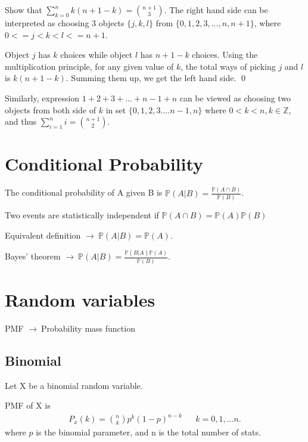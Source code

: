 \documentclass[10pt,a4paper]{article}
\newcommand{\prob}{\mathbb{P}}
\newcommand{\g}{$\rightarrow\ $}
\begin{document}
  \begin{exec}{}{}
    Show that $\sum_{k=0}^{n} k(n+1-k)={n+1 \choose 3}$.
    \tcblower
    The right hand side can be interpreted as choosing 3 objects $\{j,k,l\}$ from $\{0,1,2,3,...,n,n+1\}$, where $0<=j<k<l<=n+1$.

    Object $j$ has $k$ choices while object $l$ has $n+1-k$ choices. Using the multiplication principle, for any given value of $k$, the total ways of picking $j$ and $l$ is $k(n+1-k)$. Summing them up, we get the left hand side.
    \qed

    Similarly, expression $1+2+3+...+n-1+n$ can be viewed as choosing two objects from both side of $k$ in set $\{0,1,2,3....n-1,n\}$ where $0<k<n, k \in \mathbb{Z}$, and thus $\sum_{i=1}^{n}i={n+1 \choose 2}$.
  \end{exec}

  \section{Conditional Probability}

  \begin{fact}{}{}
    The conditional probability of A given B is $\prob(A|B) = \frac{\prob(A\cap B)}{\prob(B)}$.
  \end{fact}

  \begin{fact}{}{}
    Two events are statistically independent if $\prob(A\cap B) = \prob(A)\prob(B)$
  \end{fact}

  Equivalent definition \g $\prob(A|B) = \prob(A)$.

  \begin{fact}{}{}
    Bayes’ theorem \g $\prob(A|B) = \frac{\prob (B|A)\prob(A)}{\prob(B)}$.
  \end{fact}


  \section{Random variables}

  PMF \g Probability mass function

  \subsection{Binomial}

  \begin{fact}{}{}
    Let X be a binomial random variable.

    PMF of X is
    \begin{align}
      P_x(k) = \binom{n}{k}p^k(1-p)^{n-k} &&k=0,1,...n.
    \end{align}
    where $p$ is the binomial parameter, and n is the total number of stats.

  \end{fact}
\end{document}
